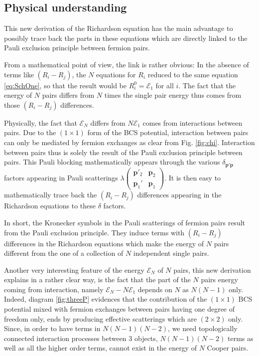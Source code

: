 \documentclass[aps,prb,amsmath,amssymb,superscriptaddress,twocolumn]{revtex4-1}
\newcommand{\vp}{\ensuremath{\mathbf{p}}}
\newcommand{\E}{\ensuremath{\mathbf{E}}}
\newcommand{\br}[1]{\ensuremath{\left(#1\right)}}
\newcommand{\fmtrx}[4]{\ensuremath{\br{\begin{smallmatrix}#1&#2\\#3&#4\end{smallmatrix}}}}
\renewcommand{\E}{\ensuremath{\mathcal{E}}}
\begin{document}
\subsection{Physical understanding}
This new derivation of the Richardson equation has the main advantage to possibly trace back the parts in these equations which are directly linked to the Pauli exclusion principle between fermion pairs. 

From a mathematical point of view, the link is rather obvious: In the absence of terms like $(R_i-R_j)$, the $N$ equations for $R_i$ reduced to the same equation \eqref{eq:SchOne}, so that the result would be $R^0_i=\E_1$ for all $i$.  The fact that the energy of $N$ pairs differs from $N$ times the single pair energy thus comes from those $(R_i-R_j)$ differences. 

Physically, the fact that $\E_N$ differs from $N\E_1$ comes from interactions between pairs. Due to the $(1\times1)$ form of the BCS potential, interaction between pairs can only be mediated by fermion exchanges as clear from Fig. \ref{fig:chi}.  Interaction between pairs thus is solely the result of the Pauli exclusion principle between pairs. This Pauli blocking mathematically appears through the various $\delta_{\vp'\vp}$ factors appearing in Pauli scatterings 
$\lambda\fmtrx{\vp'_2}{\vp_2}{\vp_1'}{\vp_1}$.  It is then easy to mathematically trace back the  $(R_i-R_j)$ differences appearing in the Richardson equations to these $\delta$ factors. 

In short, the Kronecker symbols in the Pauli scatterings of  fermion pairs result from the Pauli exclusion principle.  They induce terms with $(R_i-R_j)$ differences in the Richardson equations which make the energy of $N$ pairs different from the one of a collection of $N$ independent single pairs. 

Another very interesting feature of the energy $\E_N$ of $N$ pairs, this new derivation explains in a rather clear way, is the fact that the part of the $N$ pairs energy coming from interaction, namely $\E_N-N\E_1$ depends on $N$ as $N(N-1)$ only. Indeed, diagram \ref{fig:threeP} evidences that the contribution of the $(1\times1)$ BCS potential mixed with fermion exchanges between pairs having one degree of freedom only, ends by producing effective scatterings which are $(2\times2)$ only.  Since, in order to have terms in $N(N-1)(N-2)$, we need topologically connected interaction processes between 3 objects, $N(N-1)(N-2)$ terms as well as all the higher order terms, cannot exist in the energy of $N$ Cooper pairs.
\end{document}
